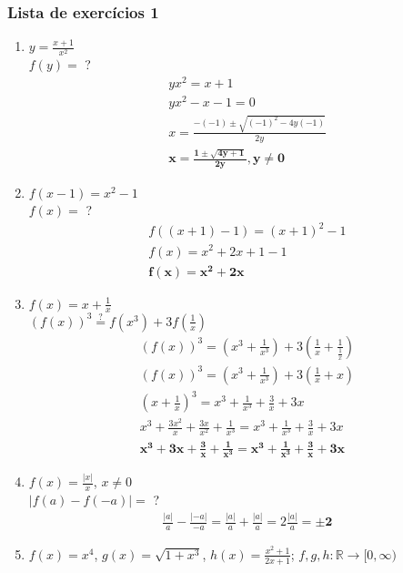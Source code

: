 \documentclass{article}
\begin{document}
\subsubsection*{Lista de exercícios 1}
\begin{enumerate}\bfseries
    \item $y = \frac{x+1}{x^2}$ \\
    $f(y)=$ ?
        \begin{gather*}
            yx^2 = x + 1 \\
            yx^2 - x - 1 = 0 \\
            x = \frac{-(-1) \pm \sqrt{(-1)^2 - 4y(-1)}}{2y} \\
            \mathbf{x = \frac{1 \pm \sqrt{4y + 1}}{2y}, y \neq 0}
        \end{gather*}
    \item $f(x-1) = x^2 - 1$ \\
    $f(x)=$ ?
        \begin{gather*}
            f((x + 1) - 1) = (x + 1)^2 - 1 \\
            f(x) = x^2 + 2x + 1 - 1 \\
            \mathbf{f(x) = x^2 + 2x}
        \end{gather*}
    \item $f(x) = x + \frac{1}{x}$ \\
    $(f(x))^3 \stackrel{?}{=} f(x^3) + 3f(\frac{1}{x})$
        \begin{gather*}
            (f(x))^3 = (x^3 + \frac{1}{x^3}) + 3({\frac{1}{x}} + \frac{1}{\frac{1}{x}}) \\
            (f(x))^3 = (x^3 + \frac{1}{x^3}) + 3(\frac{1}{x} + x) \\
            (x + \frac{1}{x})^3 = x^3 + \frac{1}{x^3} + {\frac{3}{x} + 3x} \\
            x^3 + \frac{3x^2}{x} + \frac{3x}{x^2} + \frac{1}{x^3} = x^3 + \frac{1}{x^3} + {\frac{3}{x} + 3x} \\
           \mathbf{x^3 + 3x + \frac{3}{x} + \frac{1}{x^3} = x^3 + \frac{1}{x^3} + {\frac{3}{x}} + 3x}
        \end{gather*}
    \item $f(x) = \frac{|x|}{x}$, $x \neq 0$ \\
    $|f(a) - f(-a)| =$ ?
        \begin{gather*}
            \frac{|a|}{a} - \frac{|-a|}{-a} =
            \frac{|a|}{a} + \frac{|a|}{a} = 2\frac{|a|}{a} = \mathbf{\pm2}
        \end{gather*}
    \item $f(x) = x^4$, $g(x) = \sqrt{1+x^3}$, $h(x) = \frac{x^2 + 1}{2x + 1}$; $f,g,h : \mathbb{R} \rightarrow [0, \infty)$

\end{enumerate}
\end{document}
